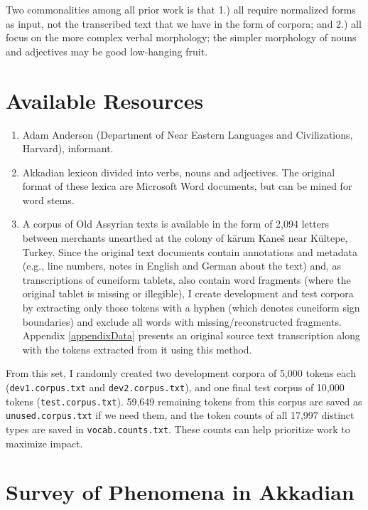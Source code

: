 \documentclass[11pt,letterpaper]{article}
\begin{document}
Two commonalities among all prior work is that 1.) all require normalized forms as input, not the transcribed text that we have in the form of corpora; and 2.) all focus on the more complex verbal morphology; the simpler morphology of nouns and adjectives may be good low-hanging fruit.

\section{Available Resources}
\label{resources}

\begin{enumerate}
\item Adam Anderson (Department of Near Eastern Languages and Civilizations, Harvard), informant.

\item Akkadian lexicon divided into verbs, nouns and adjectives.  The original format of these lexica are Microsoft Word documents, but can be mined for word stems.

\item A corpus of Old Assyrian texts is available in the form of 2,094 letters between merchants unearthed at the colony of kārum Kaneš near K\"ultepe, Turkey.  Since the original text documents contain annotations and metadata (e.g., line numbers, notes in English and German about the text) and, as transcriptions of cuneiform tablets, also contain word fragments (where the original tablet is missing or illegible), I create development and test corpora by extracting only those tokens with a hyphen (which denotes cuneiform sign boundaries) and exclude all words with missing/reconstructed fragments.  Appendix \ref{appendixData} presents an original source text transcription along with the tokens extracted from it using this method.
\end{enumerate}

From this set, I randomly created two development corpora of 5,000 tokens each (\texttt{dev1.corpus.txt} and \texttt{dev2.corpus.txt}), and one final test corpus of 10,000 tokens (\texttt{test.corpus.txt}).  59,649 remaining tokens from this corpus are saved as \texttt{unused.corpus.txt} if we need them, and the token counts of all 17,997 distinct types are saved in \texttt{vocab.counts.txt}.  These counts can help prioritize work to maximize impact.

\section{Survey of Phenomena in Akkadian}
\end{document}
